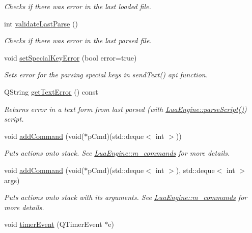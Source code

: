 \begin{DoxyCompactItemize}
\begin{DoxyCompactList}\small\item\em Checks if there was error in the last loaded file. \end{DoxyCompactList}\item 
int \hyperlink{class_lua_engine_aed08b6b1d8b4a637bb3e24a397ea1aaf}{validate\-Last\-Parse} ()
\begin{DoxyCompactList}\small\item\em Checks if there was error in the last parsed file. \end{DoxyCompactList}\item 
void \hyperlink{class_lua_engine_a92df2282a9f711f80f034aae6fb26303}{set\-Special\-Key\-Error} (bool error=true)
\begin{DoxyCompactList}\small\item\em Sets error for the parsing special keys in send\-Text() api function. \end{DoxyCompactList}\item 
Q\-String \hyperlink{class_lua_engine_af06d49221c25b93c334f9ed49571fa72}{get\-Text\-Error} () const 
\begin{DoxyCompactList}\small\item\em Returns error in a text form from last parsed (with \hyperlink{class_lua_engine_a5eae05f78704166f098ea20568c23fd7}{Lua\-Engine\-::parse\-Script()}) script. \end{DoxyCompactList}\item 
void \hyperlink{class_lua_engine_abeccc6545aa5cde1681cf61780044ab3}{add\-Command} (void($\ast$p\-Cmd)(std\-::deque$<$ int $>$))
\begin{DoxyCompactList}\small\item\em Puts actions onto stack. See \hyperlink{class_lua_engine_a86a3f32127e36e1ccce6c5a42a298ad5}{Lua\-Engine\-::m\-\_\-commands} for more details. \end{DoxyCompactList}\item 
void \hyperlink{class_lua_engine_a1046fcf4498761e9c35165b99ca09987}{add\-Command} (void($\ast$p\-Cmd)(std\-::deque$<$ int $>$), std\-::deque$<$ int $>$ args)
\begin{DoxyCompactList}\small\item\em Puts actions onto stack with its arguments. See \hyperlink{class_lua_engine_a86a3f32127e36e1ccce6c5a42a298ad5}{Lua\-Engine\-::m\-\_\-commands} for more details. \end{DoxyCompactList}\item 
void \hyperlink{class_lua_engine_a021846fc7d821e449fa1ce8d96c7dbc9}{timer\-Event} (Q\-Timer\-Event $\ast$e)

\end{DoxyCompactItemize}
